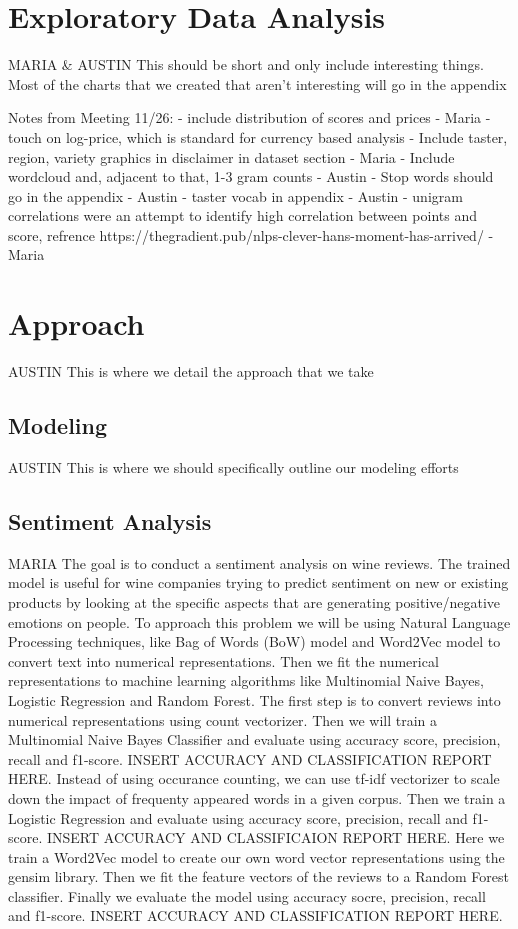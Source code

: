 \documentclass[11pt,english]{article}
\begin{document}
\section{Exploratory Data Analysis}
    MARIA \& AUSTIN
    This should be short and only include interesting things. Most of the charts that we created that aren't interesting will go in the appendix

    Notes from Meeting 11/26:
    - include distribution of scores and prices - Maria
        - touch on log-price, which is standard for currency based analysis
    - Include taster, region, variety graphics in disclaimer in dataset section - Maria
    - Include wordcloud and, adjacent to that, 1-3 gram counts - Austin
    - Stop words should go in the appendix - Austin
    - taster vocab in appendix - Austin
    - unigram correlations were an attempt to identify high correlation between points and score, refrence https://thegradient.pub/nlps-clever-hans-moment-has-arrived/ - Maria

\section{Approach}
    AUSTIN
    This is where we detail the approach that we take

\subsection{Modeling}
    AUSTIN
    This is where we should specifically outline our modeling efforts

\subsection{Sentiment Analysis}
    MARIA
    The goal is to conduct a sentiment analysis on wine reviews. The trained model is useful for wine companies trying to predict sentiment on new or existing products by looking at the specific aspects that are generating positive/negative emotions on people.   
    To approach this problem we will be using Natural Language Processing techniques, like Bag of Words (BoW) model and Word2Vec model to convert text into numerical representations. Then we fit the numerical representations to machine learning algorithms like Multinomial Naive Bayes, Logistic Regression and Random Forest. 
    The first step is to convert reviews into numerical representations using count vectorizer. Then we will train a Multinomial Naive Bayes Classifier and evaluate using accuracy score, precision, recall and f1-score. 
    INSERT ACCURACY AND CLASSIFICATION REPORT HERE.
    Instead of using occurance counting, we can use tf-idf vectorizer to scale down the impact of frequenty appeared words in a given corpus. Then we train a Logistic Regression and evaluate using accuracy score, precision, recall and f1-score. 
    INSERT ACCURACY AND CLASSIFICAION REPORT HERE. 
    Here we train a Word2Vec model to create our own word vector representations using the gensim library. Then we fit the feature vectors of the reviews to a Random Forest classifier. Finally we evaluate the model using accuracy socre, precision, recall and f1-score. 
    INSERT ACCURACY AND CLASSIFICATION REPORT HERE. 
\end{document}
